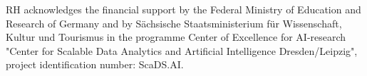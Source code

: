 \documentclass{ecai}
\begin{document}


\begin{ack}
RH acknowledges the financial support by the Federal Ministry of Education and Research of Germany and by Sächsische Staatsministerium für Wissenschaft, Kultur und Tourismus in the programme Center of Excellence for AI-research "Center for Scalable Data Analytics and Artificial Intelligence Dresden/Leipzig", project identification number: ScaDS.AI.

\end{ack}




\end{document}

